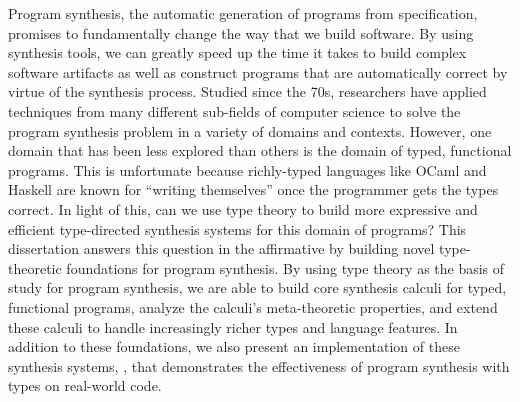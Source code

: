 Program synthesis, the automatic generation of programs from specification, promises to fundamentally change the way that we build software.
By using synthesis tools, we can greatly speed up the time it takes to build complex software artifacts as well as construct programs that are automatically correct by virtue of the synthesis process.
Studied since the 70s, researchers have applied techniques from many different sub-fields of computer science to solve the program synthesis problem in a variety of domains and contexts.
However, one domain that has been less explored than others is the domain of typed, functional programs.
This is unfortunate because richly-typed languages like OCaml and Haskell are known for ``writing themselves'' once the programmer gets the types correct.
In light of this, can we use type theory to build more expressive and efficient type-directed synthesis systems for this domain of programs?
This dissertation answers this question in the affirmative by building novel type-theoretic foundations for program synthesis.
By using type theory as the basis of study for program synthesis, we are able to build core synthesis calculi for typed, functional programs, analyze the calculi's meta-theoretic properties, and extend these calculi to handle increasingly richer types and language features.
In addition to these foundations, we also present an implementation of these synthesis systems, \myth{}, that demonstrates the effectiveness of program synthesis with types on real-world code.
